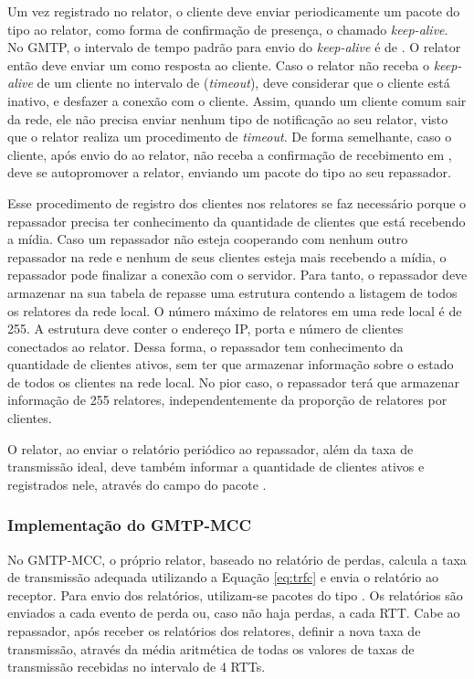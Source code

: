 Um vez registrado no relator, o cliente deve enviar periodicamente um pacote do tipo  ao relator, como forma de confirmação de presença, o chamado \emph{keep-alive}. No GMTP, o intervalo de tempo padrão para envio do \emph{keep-alive} é de .
O relator então deve enviar um  como resposta ao cliente. 
Caso o relator não receba o \emph{keep-alive} de um cliente no intervalo de  (\textit{timeout}), deve considerar que o cliente está inativo, e desfazer a conexão com o cliente.
Assim, quando um cliente comum sair da rede, ele não precisa enviar nenhum tipo de notificação ao seu relator, visto que o relator realiza um procedimento de \textit{timeout}.
De forma semelhante, caso o cliente, após envio do  ao relator, não receba a confirmação de recebimento em , deve se autopromover a relator, enviando um pacote do tipo  ao seu repassador. 

Esse procedimento de registro dos clientes nos relatores se faz necessário porque o repassador precisa ter conhecimento da quantidade de clientes que está recebendo a mídia. Caso um repassador não esteja cooperando com nenhum outro repassador na rede e nenhum de seus clientes esteja mais recebendo a mídia, o repassador pode finalizar a conexão com o servidor.
Para tanto, o repassador deve armazenar na sua tabela de repasse uma estrutura contendo a listagem de todos os relatores da rede local. O número máximo de relatores em uma rede local é de 255. A estrutura deve conter o endereço IP, porta e número de clientes conectados ao relator. Dessa forma, o repassador tem conhecimento da quantidade de clientes ativos, sem ter que armazenar informação sobre o estado de todos os clientes na rede local. No pior caso, o repassador terá que armazenar informação de 255 relatores, independentemente da proporção de relatores por clientes.

O relator, ao enviar o relatório periódico ao repassador, além da taxa de transmissão ideal, deve também informar a quantidade de clientes ativos e registrados nele, através do campo  do pacote .

\subsubsection{Implementação do GMTP-MCC}
\label{sec:gmtp-mcc-impl}

No GMTP-MCC, o próprio relator, baseado no relatório de perdas, calcula a taxa de transmissão adequada utilizando a Equação \ref{eq:trfc} e envia o relatório ao receptor. 
Para envio dos relatórios, utilizam-se pacotes do tipo . 
Os relatórios são enviados a cada evento de perda ou, caso não haja perdas, a cada RTT.
Cabe ao repassador, após receber os relatórios dos relatores, definir a nova taxa de transmissão, através da média aritmética de todas os valores de taxas de transmissão recebidas no intervalo de 4 RTTs.

